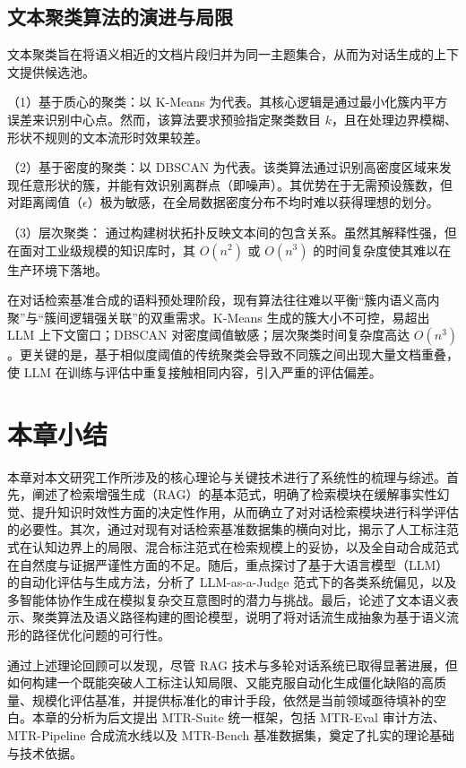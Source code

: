 \subsection{文本聚类算法的演进与局限}

文本聚类旨在将语义相近的文档片段归并为同一主题集合，从而为对话生成的上下文提供候选池。

（1）基于质心的聚类：以 K-Means 为代表。其核心逻辑是通过最小化簇内平方误差来识别中心点。然而，该算法要求预验指定聚类数目 $k$，且在处理边界模糊、形状不规则的文本流形时效果较差。

（2）基于密度的聚类：以 DBSCAN 为代表。该类算法通过识别高密度区域来发现任意形状的簇，并能有效识别离群点（即噪声）。其优势在于无需预设簇数，但对距离阈值（$\epsilon$）极为敏感，在全局数据密度分布不均时难以获得理想的划分。

（3）层次聚类： 通过构建树状拓扑反映文本间的包含关系。虽然其解释性强，但在面对工业级规模的知识库时，其 $O(n^2)$ 或 $O(n^3)$ 的时间复杂度使其难以在生产环境下落地。

在对话检索基准合成的语料预处理阶段，现有算法往往难以平衡“簇内语义高内聚”与“簇间逻辑强关联”的双重需求。K-Means 生成的簇大小不可控，易超出 LLM 上下文窗口；DBSCAN 对密度阈值敏感；层次聚类时间复杂度高达 $O(n^3)$。更关键的是，基于相似度阈值的传统聚类会导致不同簇之间出现大量文档重叠，使 LLM 在训练与评估中重复接触相同内容，引入严重的评估偏差。



\section{本章小结}

本章对本文研究工作所涉及的核心理论与关键技术进行了系统性的梳理与综述。首先，阐述了检索增强生成（RAG）的基本范式，明确了检索模块在缓解事实性幻觉、提升知识时效性方面的决定性作用，从而确立了对对话检索模块进行科学评估的必要性。其次，通过对现有对话检索基准数据集的横向对比，揭示了人工标注范式在认知边界上的局限、混合标注范式在检索规模上的妥协，以及全自动合成范式在自然度与证据严谨性方面的不足。随后，重点探讨了基于大语言模型（LLM）的自动化评估与生成方法，分析了 LLM-as-a-Judge 范式下的各类系统偏见，以及多智能体协作生成在模拟复杂交互意图时的潜力与挑战。最后，论述了文本语义表示、聚类算法及语义路径构建的图论模型，说明了将对话流生成抽象为基于语义流形的路径优化问题的可行性。

通过上述理论回顾可以发现，尽管 RAG 技术与多轮对话系统已取得显著进展，但如何构建一个既能突破人工标注认知局限、又能克服自动化生成僵化缺陷的高质量、规模化评估基准，并提供标准化的审计手段，依然是当前领域亟待填补的空白。本章的分析为后文提出 MTR-Suite 统一框架，包括 MTR-Eval 审计方法、MTR-Pipeline 合成流水线以及 MTR-Bench 基准数据集，奠定了扎实的理论基础与技术依据。

